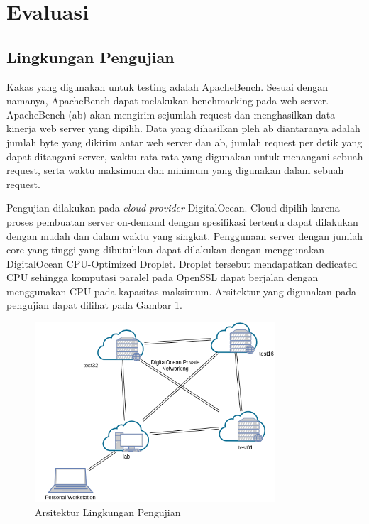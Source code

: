 
\section{Evaluasi}
\subsection{Lingkungan Pengujian}

Kakas yang digunakan untuk testing adalah ApacheBench. Sesuai dengan namanya, ApacheBench dapat melakukan benchmarking pada web server. ApacheBench (ab) akan mengirim sejumlah request dan menghasilkan data kinerja web server yang dipilih. Data yang dihasilkan pleh ab diantaranya adalah jumlah byte yang dikirim antar web server dan ab, jumlah request per detik yang dapat ditangani server, waktu rata-rata yang digunakan untuk menangani sebuah request, serta waktu maksimum dan minimum yang digunakan dalam sebuah request.

Pengujian dilakukan pada \textit{cloud provider} DigitalOcean. Cloud dipilih karena proses pembuatan server on-demand dengan spesifikasi tertentu dapat dilakukan dengan mudah dan dalam waktu yang singkat. Penggunaan server dengan jumlah core yang tinggi yang dibutuhkan dapat dilakukan dengan menggunakan DigitalOcean CPU-Optimized Droplet. Droplet tersebut mendapatkan dedicated CPU sehingga komputasi paralel pada OpenSSL dapat berjalan dengan menggunakan CPU pada kapasitas maksimum. Arsitektur yang digunakan pada pengujian dapat dilihat pada Gambar \ref{fig:testing_arch}.

\begin{figure}[h]
  \centering
  \includegraphics[width=0.8\textwidth]{resources/ch-4/testing_arch.png}
  \caption{Arsitektur Lingkungan Pengujian}
  \label{fig:testing_arch}
\end{figure}

